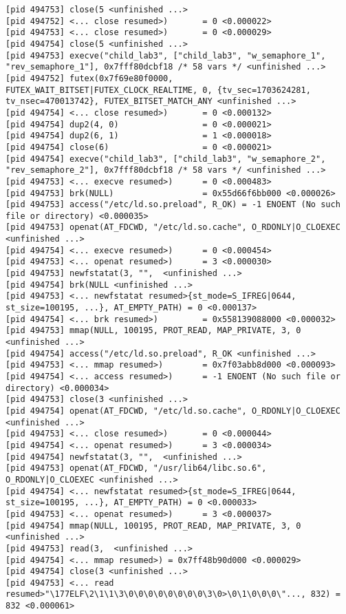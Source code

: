 \documentclass[a4paper, 12pt]{article}
\begin{document}
\begin{lstlisting}
[pid 494753] close(5 <unfinished ...>
[pid 494752] <... close resumed>)       = 0 <0.000022>
[pid 494753] <... close resumed>)       = 0 <0.000029>
[pid 494754] close(5 <unfinished ...>
[pid 494753] execve("child_lab3", ["child_lab3", "w_semaphore_1", "rev_semaphore_1"], 0x7fff80dcbf18 /* 58 vars */ <unfinished ...>
[pid 494752] futex(0x7f69e80f0000, FUTEX_WAIT_BITSET|FUTEX_CLOCK_REALTIME, 0, {tv_sec=1703624281, tv_nsec=470013742}, FUTEX_BITSET_MATCH_ANY <unfinished ...>
[pid 494754] <... close resumed>)       = 0 <0.000132>
[pid 494754] dup2(4, 0)                 = 0 <0.000021>
[pid 494754] dup2(6, 1)                 = 1 <0.000018>
[pid 494754] close(6)                   = 0 <0.000021>
[pid 494754] execve("child_lab3", ["child_lab3", "w_semaphore_2", "rev_semaphore_2"], 0x7fff80dcbf18 /* 58 vars */ <unfinished ...>
[pid 494753] <... execve resumed>)      = 0 <0.000483>
[pid 494753] brk(NULL)                  = 0x55d66f6bb000 <0.000026>
[pid 494753] access("/etc/ld.so.preload", R_OK) = -1 ENOENT (No such file or directory) <0.000035>
[pid 494753] openat(AT_FDCWD, "/etc/ld.so.cache", O_RDONLY|O_CLOEXEC <unfinished ...>
[pid 494754] <... execve resumed>)      = 0 <0.000454>
[pid 494753] <... openat resumed>)      = 3 <0.000030>
[pid 494753] newfstatat(3, "",  <unfinished ...>
[pid 494754] brk(NULL <unfinished ...>
[pid 494753] <... newfstatat resumed>{st_mode=S_IFREG|0644, st_size=100195, ...}, AT_EMPTY_PATH) = 0 <0.000137>
[pid 494754] <... brk resumed>)         = 0x558139088000 <0.000032>
[pid 494753] mmap(NULL, 100195, PROT_READ, MAP_PRIVATE, 3, 0 <unfinished ...>
[pid 494754] access("/etc/ld.so.preload", R_OK <unfinished ...>
[pid 494753] <... mmap resumed>)        = 0x7f03abb8d000 <0.000093>
[pid 494754] <... access resumed>)      = -1 ENOENT (No such file or directory) <0.000034>
[pid 494753] close(3 <unfinished ...>
[pid 494754] openat(AT_FDCWD, "/etc/ld.so.cache", O_RDONLY|O_CLOEXEC <unfinished ...>
[pid 494753] <... close resumed>)       = 0 <0.000044>
[pid 494754] <... openat resumed>)      = 3 <0.000034>
[pid 494754] newfstatat(3, "",  <unfinished ...>
[pid 494753] openat(AT_FDCWD, "/usr/lib64/libc.so.6", O_RDONLY|O_CLOEXEC <unfinished ...>
[pid 494754] <... newfstatat resumed>{st_mode=S_IFREG|0644, st_size=100195, ...}, AT_EMPTY_PATH) = 0 <0.000033>
[pid 494753] <... openat resumed>)      = 3 <0.000037>
[pid 494754] mmap(NULL, 100195, PROT_READ, MAP_PRIVATE, 3, 0 <unfinished ...>
[pid 494753] read(3,  <unfinished ...>
[pid 494754] <... mmap resumed>) = 0x7ff48b90d000 <0.000029>
[pid 494754] close(3 <unfinished ...>
[pid 494753] <... read resumed>"\177ELF\2\1\1\3\0\0\0\0\0\0\0\0\3\0>\0\1\0\0\0\"..., 832) = 832 <0.000061>

\end{lstlisting}
\end{document}
